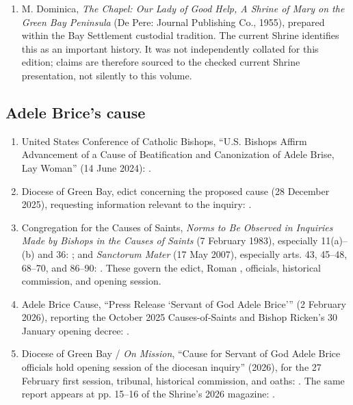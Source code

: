 \begin{enumerate}
  \item M. Dominica, \emph{The Chapel: Our Lady of Good Help, A Shrine of Mary on the Green Bay Peninsula} (De Pere: Journal Publishing Co., 1955), prepared within the Bay Settlement custodial tradition. The current Shrine identifies this as an important history. It was not independently collated for this edition; claims are therefore sourced to the checked current Shrine presentation, not silently to this volume.
\end{enumerate}

\subsection{Adele Brice's cause}

\begin{enumerate}
  \item United States Conference of Catholic Bishops, “U.S. Bishops Affirm Advancement of a Cause of Beatification and Canonization of Adele Brise, Lay Woman” (14 June 2024): .
  \item Diocese of Green Bay, edict concerning the proposed cause (28 December 2025), requesting information relevant to the inquiry: .
  \item Congregation for the Causes of Saints, \emph{Norms to Be Observed in Inquiries Made by Bishops in the Causes of Saints} (7 February 1983), especially 11(a)--(b) and 36: ; and \emph{Sanctorum Mater} (17 May 2007), especially arts. 43, 45--48, 68--70, and 86--90: . These govern the edict, Roman , officials, historical commission, and opening session.
  \item Adele Brice Cause, “Press Release ‘Servant of God Adele Brice’” (2 February 2026), reporting the October 2025 Causes-of-Saints  and Bishop Ricken's 30 January opening decree: .
  \item Diocese of Green Bay / \emph{On Mission}, “Cause for Servant of God Adele Brice officials hold opening session of the diocesan inquiry” (2026), for the 27 February first session, tribunal, historical commission, and oaths: . The same report appears at pp. 15--16 of the Shrine's 2026 magazine: .
\end{enumerate}

